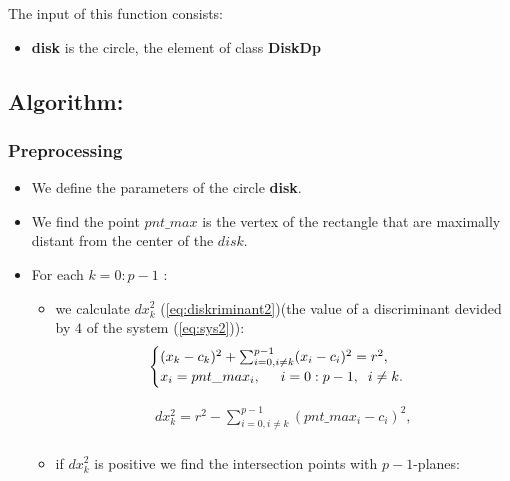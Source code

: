 \documentclass{report}
\begin{document}
	The input of this function consists:
	
	\begin{itemize}	
		\item {\bfseries disk}  is the circle, the element of class {\bfseries DiskDp} 
	\end{itemize}
	
	\subsection*{Algorithm:}
	
	\subsubsection*{Preprocessing}
	
	\begin{itemize}
		\item We define the parameters of the circle {\bfseries disk}.
			
		\item We  find the point $pnt\_max$ is the vertex of the rectangle that are  maximally distant from the center of the $disk$.
			
		\item For each $k = 0:p-1$ :
		\begin{itemize}
			\item  we calculate $dx_k^2$ (\ref{eq:diskriminant2})(the value of a discriminant devided by  $4$ of the system (\ref{eq:sys2})):
			\begin{equation}
				\begin{cases}
					(x_k - c_k)^2 + \sum_{i=0, i \neq k}^{p-1} (x_i - c_i)^2 = r^2,\\ 
					x_i = pnt\_max_i,\hspace*{5mm} i = 0:p-1, \hspace*{2mm}i \neq k.
				\end{cases}
				\label{eq:sys2}
			\end{equation}
				
			\begin{equation}
				\begin{gathered}
					dx_k^2 = r^2 - \sum_{i=0, i \neq k}^{p-1} (pnt\_max_i - c_i)^2,\\
					\label{eq:diskriminant2}
				\end{gathered}
			\end{equation}
			
			\item if $dx_k^2$ is positive we find the intersection points with $p-1$-planes:
				

\end{itemize}
\end{itemize}
\end{document}
